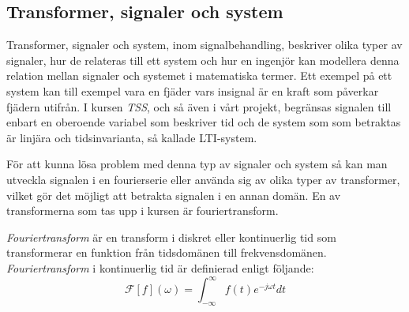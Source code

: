 \documentclass[]{article}
\begin{document}
\subsection{Transformer, signaler och system}
Transformer, signaler och system, inom signalbehandling, beskriver
olika typer av signaler, hur de relateras till ett system och hur en
ingenjör kan modellera denna relation mellan signaler och systemet i
matematiska termer. Ett exempel på ett system kan till exempel vara en
fjäder vars insignal är en kraft som påverkar fjädern utifrån. I
kursen \textit{TSS}, och så även i vårt projekt, begränsas signalen
till enbart en oberoende variabel som beskriver tid och de system som
som betraktas är linjära och tidsinvarianta, så kallade LTI-system.

För att kunna lösa problem med denna typ av signaler och system så kan
man utveckla signalen i en fourierserie eller använda sig av olika
typer av transformer, vilket gör det möjligt att betrakta signalen i
en annan domän. %
En av transformerna som tas upp i kursen är fouriertransform.


\textit{Fouriertransform} är en transform i diskret eller
kontinuerlig tid som transformerar en funktion från tidsdomänen till
frekvensdomänen. \textit{Fouriertransform} i kontinuerlig tid är
definierad enligt följande:
\[\mathcal{F}[f] (\omega) 
= \int_{-\infty}^{\infty} f(t) e^{-j \omega t} dt\]





\end{document}

